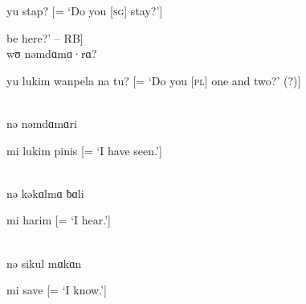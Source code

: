 \noindent yu stap? [= ‘Do you [\textsc{sg}] stay?’]

\noindent [‘Will you [\textsc{sg}] be here?’ -- RB]\\

\noindent wʊ nəmdɑmɑ·rɑ?

\noindent yu lukim wanpela na tu? [= ‘Do you [\textsc{pl}] one and two?’ (?)]

\\

\noindent nə nəmdɑmɑri

\noindent mi lukim pinis [= ‘I have seen.’]

\noindent [‘I see it.’ -- RB]\\

\noindent nə kəkɑlmɑ ƀɑli

\noindent mi harim [= ‘I hear.’]

\noindent [‘I hear it.’ -- RB]\\

\noindent nə sikul mɑkɑn

\noindent mi save [= ‘I know.’]

\noindent [‘I learn.’ -- RB]

